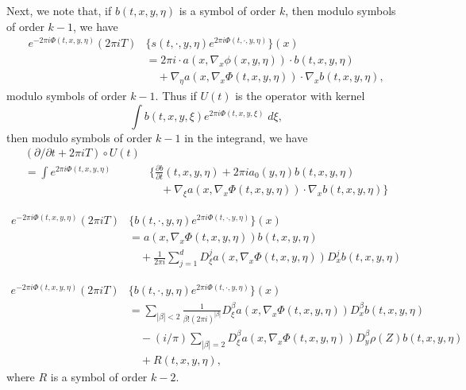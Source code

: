 Next, we note that, if $b(t,x,y,\eta)$ is a symbol of order $k$, then modulo symbols of order $k-1$, we have
%
\begin{align*}
    e^{-2 \pi i \Phi(t,x,y,\eta)} (2 \pi i T) & \{ s(t,\cdot,y,\eta) e^{2 \pi i \Phi(t,\cdot, y, \eta)} \}(x)\\
    &= 2 \pi i \cdot a(x, \nabla_x \phi(x,y,\eta)) \cdot b(t,x,y,\eta)\\
    &\quad + \nabla_\eta a(x, \nabla_x \Phi(t,x,y,\eta)) \cdot \nabla_x b(t,x,y,\eta),
\end{align*}
%
modulo symbols of order $k-1$. Thus if $U(t)$ is the operator with kernel
%
\[ \int b(t,x,y,\xi) e^{2 \pi i \Phi(t,x,y,\xi)}\; d\xi, \]
%
then modulo symbols of order $k-1$ in the integrand, we have
%
\begin{align*}
    (\partial / \partial t + 2 \pi i T) \circ U(t)\\
    = \int e^{2 \pi i \Phi(t,x,y,\eta)} & \Bigg\{ \frac{\partial b}{\partial t}(t,x,y,\eta) + 2 \pi i a_0(y,\eta) b(t,x,y,\eta)\\
    &\quad + \nabla_\xi a(x, \nabla_x \Phi(t,x,y,\eta)) \cdot \nabla_x b(t,x,y,\eta) \Bigg\}
\end{align*}

\newpage
%
\begin{align*}
    e^{-2 \pi i \Phi(t,x,y,\eta)} (2 \pi i T) & \{ b(t,\cdot,y,\eta) e^{2 \pi i \Phi(t,\cdot, y, \eta)} \}(x)\\
    &= a(x, \nabla_x \Phi(t,x,y,\eta)) b(t,x,y,\eta)\\
    &\quad + \frac{1}{2 \pi i} \sum_{j = 1}^d D^j_\xi a(x, \nabla_x \Phi(t,x,y,\eta)) D^j_x b(t,x,y,\eta)
\end{align*}


\begin{align*}
    e^{-2 \pi i \Phi(t,x,y,\eta)} (2 \pi i T) & \{ b(t,\cdot,y,\eta) e^{2 \pi i \Phi(t,\cdot, y, \eta)} \}(x)\\
    &= \sum_{|\beta| < 2} \frac{1}{\beta! (2 \pi i)^{|\beta|}} D^\beta_\xi a(x, \nabla_x \Phi(t,x,y,\eta)) D^\beta_x b(t,x,y,\eta)\\
    &\quad - (i/\pi) \sum_{|\beta| = 2} D^\beta_\xi a(x,\nabla_x \Phi(t,x,y,\eta)) D^\beta_y \rho(Z) b(t,x,y,\eta)\\
    &\quad + R(t,x,y,\eta),
\end{align*}
%
where $R$ is a symbol of order $k-2$.